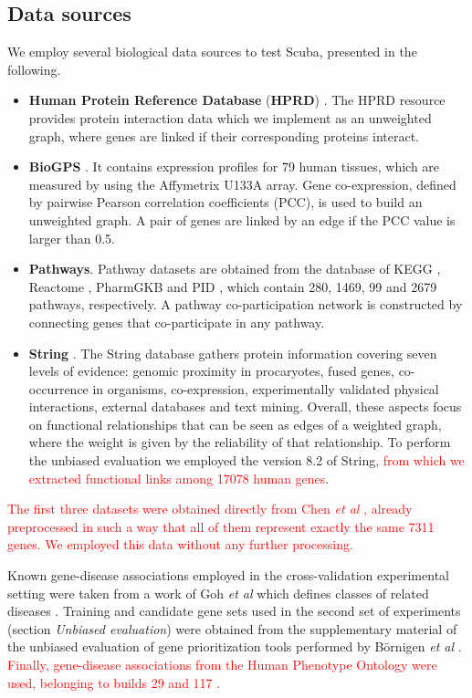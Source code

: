 \subsection*{Data sources}
We employ several biological data sources to test Scuba, presented in the following.
\begin{itemize}
	\item \textbf{Human Protein Reference Database} (\textbf{HPRD}) \cite{hprd}. The HPRD resource provides protein interaction data which we implement as an unweighted graph, where genes are linked if their corresponding proteins interact.
	\item \textbf{BioGPS} \cite{biogps}. It contains expression profiles for 79 human tissues, which are measured by using the Affymetrix U133A array. Gene co-expression, defined by pairwise Pearson correlation coefficients (PCC), is used to build an unweighted graph. A pair of genes are linked by an edge if the PCC value is larger than 0.5.
	\item \textbf{Pathways}. Pathway datasets are obtained from the database of KEGG \cite{kegg}, Reactome \cite{reactome}, PharmGKB \cite{pharmgkb} and PID \cite{pid}, which contain 280, 1469, 99 and 2679 pathways, respectively. A pathway co-participation network is constructed by connecting genes that co-participate in any pathway.
	\item \textbf{String} \cite{string}. The String database gathers protein information covering seven levels of evidence: genomic proximity in procaryotes, fused genes, co-occurrence in organisms, co-expression, experimentally validated physical interactions, external databases and text mining. Overall, these aspects focus on functional relationships that can be seen as edges of a weighted graph, where the weight is given by the reliability of that relationship. To perform the unbiased evaluation we employed the version 8.2 of String\textcolor{red}{, from which we extracted functional links among 17078 human genes}.
\end{itemize}

\textcolor{red}{The first three datasets were obtained directly from Chen \emph{et al} \cite{f3pc}, already preprocessed in such a way that all of them represent exactly the same 7311 genes. We employed this data without any further processing.}

Known gene-disease associations employed in the cross-validation experimental setting were taken from a work of Goh \emph{et al} which defines classes of related diseases \cite{goh}. Training and candidate gene sets used in the second set of experiments (section \emph{Unbiased evaluation}) were obtained from the supplementary material of the unbiased evaluation of gene prioritization tools performed by B\"ornigen \emph{et al} \cite{bornigen}. \textcolor{red}{Finally, gene-disease associations from the Human Phenotype Ontology were used, belonging to builds 29 and 117 \cite{hpo}.}


